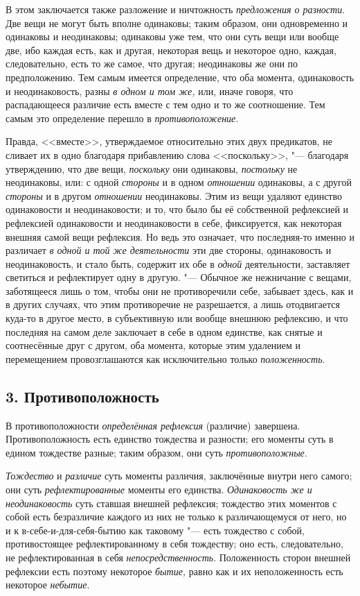 В этом заключается также разложение и ничтожность{\em
предложения о разности}. Две вещи не могут быть вполне одинаковы; таким
образом, они одновременно и одинаковы и неодинаковы; одинаковы уже тем, что
они суть вещи или вообще две, ибо каждая есть, как и другая, некоторая вещь
и некоторое одно, каждая, следовательно, есть то же самое, что другая;
неодинаковы же они по предположению. Тем самым имеется определение, что оба
момента, одинаковость и неодинаковость, разны {\em в
одном и том же,} или, иначе говоря, что распадающееся различие есть вместе
с тем одно и то же соотношение. Тем самым это определение перешло в
{\em противоположение}.

Правда, <<вместе>>, утверждаемое относительно этих двух предикатов, не сливает
их в одно благодаря прибавлению слова <<поскольку>>, "--- благодаря
утверждению, что две вещи, {\em поскольку} они
одинаковы, {\em постольку} не неодинаковы, или: с одной
{\em стороны} и в одном {\em отношении} одинаковы, а с другой
{\em стороны} и в другом {\em отношении} неодинаковы. Этим из вещи удаляют
единство одинаковости и неодинаковости; и то, что было бы её собственной
рефлексией и рефлексией одинаковости и неодинаковости в себе, фиксируется,
как некоторая внешняя самой вещи рефлексия. Но ведь это означает, что
последняя-то именно и различает {\em в одной и той же
деятельности} эти две стороны, одинаковость и неодинаковость, и стало быть,
содержит их обе в {\em одной} деятельности, заставляет
светиться и рефлектирует одну в другую. "--- Обычное же нежничание с вещами,
заботящееся лишь о том, чтобы они не противоречили себе, забывает здесь,
как и в других случаях, что этим противоречие не разрешается, а лишь
отодвигается куда-то в другое место, в субъективную или вообще внешнюю
рефлексию, и что последняя на самом деле заключает в себе в одном единстве,
как снятые и соотнесённые друг с другом, оба момента, которые этим
удалением и перемещением провозглашаются как исключительно только
{\em положенность}.


\subsection[3. Противоположность]{3. Противоположность}
В противоположности {\em определённая рефлексия} (различие) завершена.
Противоположность есть единство тождества и разности; его моменты суть в
едином тождестве разные; таким образом, они суть {\em противоположные}.

{\em Тождество} и {\em различие}
суть моменты различия, заключённые внутри него самого; они суть
{\em рефлектированные} моменты его единства.
{\em Одинаковость же и неодинаковость} суть ставшая
внешней рефлексия; тождество этих моментов с собой есть безразличие каждого
из них не только к различающемуся от него, но и к в-себе-и-для-себя-бытию
как таковому "--- есть тождество с собой, противостоящее рефлектированному в
себя тождеству; оно есть, следовательно, не рефлектированная в себя
{\em непосредственность}. Положенность сторон внешней
рефлексии есть поэтому некоторое {\em бытие,} равно как
и их неположенность есть некоторое {\em небытие}.

